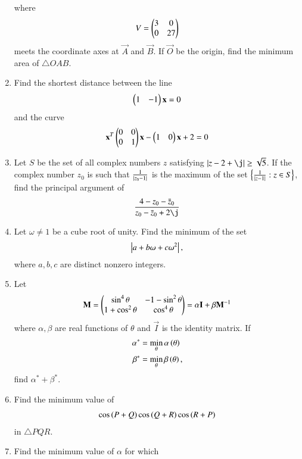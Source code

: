 \documentclass[journal,12pt,twocolumn]{IEEEtran}
\begin{document}
\begin{enumerate}[label=\arabic*.]
\begin{equation}
\end{equation}
%
where
\begin{equation}
V = \begin{pmatrix}3 & 0 \\ 0 & 27\end{pmatrix}
\end{equation}
%
meets the coordinate axes at  $\vec{A}$  and  $\vec{B}$.  If   $\vec{O}$  be the origin, find the minimum area 
of $\triangle OAB$.
\item Find the shortest distance between the line 
\begin{equation}
\begin{pmatrix}1 & -1 \end{pmatrix}\mathbf{x}  =0
\end{equation}
%
and the curve
\begin{equation}
\mathbf{x}^T\begin{pmatrix}0 & 0 \\ 0 & 1\end{pmatrix}\mathbf{x} - \begin{pmatrix}1 & 0\end{pmatrix}\mathbf{x} + 2 =0
\end{equation}
\item Let $S$ be the set of all complex numbers $z$ satisfying $\abs{z-2+\j} \ge \sqrt{5}$. If the complex number $z_0$ is such that $\frac{1}{\left\vert z_0-1\right\vert}$ is the maximum of the set $\left\{\frac{1}{\left\vert z-1\right\vert}: z \in S\right\}$, find the principal argument of 
\begin{align}
\frac{4-z_0-\bar{z}_0}{z_0-\bar{z}_0+2\j}
\end{align}
\item Let $\omega \ne 1$ be a cube root of unity. Find the minimum of the set
\begin{align}
\left\vert a+b\omega+c\omega^2\right\vert, 
\end{align}
%
where $a,b,c$ are distinct nonzero integers.
\item Let 
\begin{align}
\label{eq:mat_def}
\mathbf{M} = \begin{pmatrix}\sin^4\theta & -1-\sin^2\theta \\ 1+ \cos^2\theta & \cos^4\theta\end{pmatrix} = \alpha\mathbf{I} + \beta \mathbf{M}^{-1}
\end{align}
where $\alpha, \beta$ are real functions of $\theta$ and $\vec{I}$ is the identity matrix. If 
\begin{align}
\alpha^{*} &= \min_{\theta}\alpha\left(\theta\right)
\\
\beta^{*} &= \min_{\theta}\beta\left(\theta\right), 
\end{align}
find $\alpha^{*} + \beta^{*}$.
\item Find the minimum value of 
\begin{align}
\cos \left(P+Q\right)
\cos \left(Q+R\right)
\cos \left(R+P\right)
\end{align}
%
in $\triangle PQR$.
\item Find the minimum value of $\alpha$ for which 

\end{enumerate}
\end{document}
